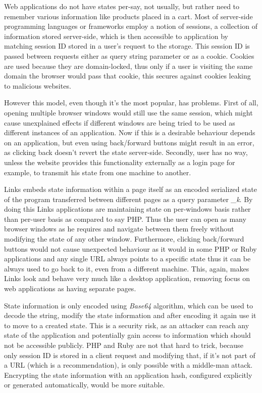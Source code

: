 Web applications do not have states per-say, not usually, but rather need to remember various information like products placed in a cart. Most of server-side programming languages or frameworks employ a notion of sessions, a collection of information stored server-side, which is then accessible to application by matching session ID stored in a user's request to the storage. This session ID is passed between requests either as query string parameter or as a cookie. Cookies are used because they are domain-locked, thus only if a user is visiting the same domain the browser would pass that cookie, this secures against cookies leaking to malicious websites. 

However this model, even though it's the most popular, has problems. First of all, opening multiple browser windows would still use the same session, which might cause unexplained effects if different windows are being tried to be used as different instances of an application. Now if this is a desirable behaviour depends on an application, but even using back/forward buttons might result in an error, as clicking back doesn't revert the state server-side. Secondly, user has no way, unless the website provides this functionality externally as a login page for example, to transmit his state from one machine to another.

Links embeds state information within a page itself as an encoded serialized state of the program transferred between different pages as a query parameter \textit{\_k}. By doing this Links applications are maintaining state on per-windows basis rather than per-user basis as compared to say PHP. Thus the user can open as many browser windows as he requires and navigate between them freely without modifying the state of any other window. Furthermore, clicking back/forward buttons would not cause unexpected behaviour as it would in some PHP or Ruby applications and any single URL always points to a specific state thus it can be always used to go back to it, even from a different machine. This, again, makes Links look and behave very much like a desktop application, removing focus on web applications as having separate pages.

State information is only encoded using \textit{Base64} algorithm, which can be used to decode the string, modify the state information and after encoding it again use it to move to a created state. This is a security risk, as an attacker can reach any state of the application and potentially gain access to information which should not be accessible publicly. PHP and Ruby are not that hard to trick, because only session ID is stored in a client request and modifying that, if it's not part of a URL (which is a recommendation), is only possible with a middle-man attack. Encrypting the state information with an application hash, configured explicitly or generated automatically, would be more suitable.

